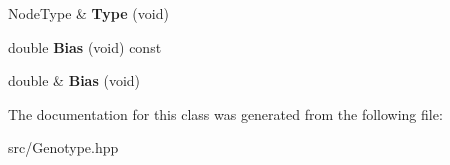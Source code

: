 \begin{DoxyCompactItemize}
Node\+Type \& {\bfseries Type} (void)
\item 
\mbox{\label{class_indie_neat_1_1_genotype_1_1_node_a0071ac8dda692f16c518d4446da9a257}} 
double {\bfseries Bias} (void) const
\item 
\mbox{\label{class_indie_neat_1_1_genotype_1_1_node_ae31fd0bcb4e8296ef7b184ff3b5889ba}} 
double \& {\bfseries Bias} (void)
\end{DoxyCompactItemize}


The documentation for this class was generated from the following file\+:\begin{DoxyCompactItemize}
\item 
src/Genotype.\+hpp\end{DoxyCompactItemize}
